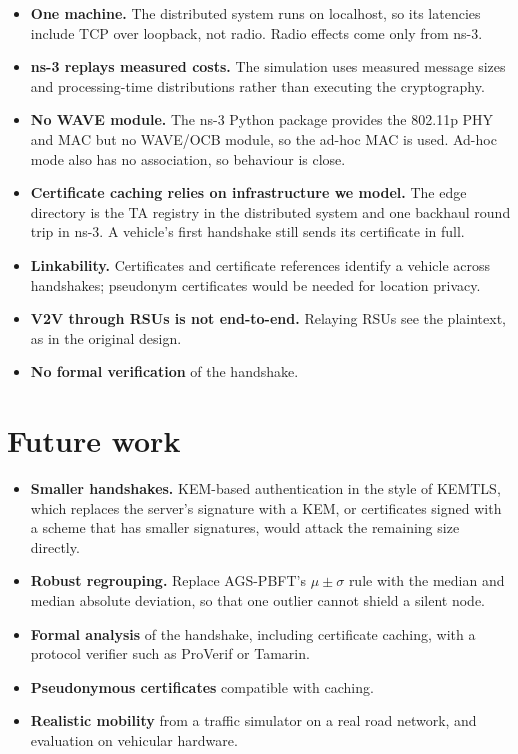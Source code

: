 \begin{itemize}
\item \textbf{One machine.} The distributed system runs on localhost, so its
latencies include TCP over loopback, not radio. Radio effects come only from
ns-3.
\item \textbf{ns-3 replays measured costs.} The simulation uses measured
message sizes and processing-time distributions rather than executing the
cryptography.
\item \textbf{No WAVE module.} The ns-3 Python package provides the 802.11p
PHY and MAC but no WAVE/OCB module, so the ad-hoc MAC is used. Ad-hoc mode
also has no association, so behaviour is close.
\item \textbf{Certificate caching relies on infrastructure we model.} The
edge directory is the TA registry in the distributed system and one backhaul
round trip in ns-3. A vehicle's first handshake still sends its certificate in
full.
\item \textbf{Linkability.} Certificates and certificate references identify a
vehicle across handshakes; pseudonym certificates would be needed for
location privacy.
\item \textbf{V2V through RSUs is not end-to-end.} Relaying RSUs see the
plaintext, as in the original design.
\item \textbf{No formal verification} of the handshake.
\end{itemize}

\section{Future work}

\begin{itemize}
\item \textbf{Smaller handshakes.} KEM-based authentication in the style of
KEMTLS, which replaces the server's signature with a KEM, or certificates
signed with a scheme that has smaller signatures, would attack the remaining
size directly.
\item \textbf{Robust regrouping.} Replace AGS-PBFT's $\mu \pm \sigma$ rule
with the median and median absolute deviation, so that one outlier cannot
shield a silent node.
\item \textbf{Formal analysis} of the handshake, including certificate
caching, with a protocol verifier such as ProVerif or Tamarin.
\item \textbf{Pseudonymous certificates} compatible with caching.
\item \textbf{Realistic mobility} from a traffic simulator on a real road
network, and evaluation on vehicular hardware.
\end{itemize}

